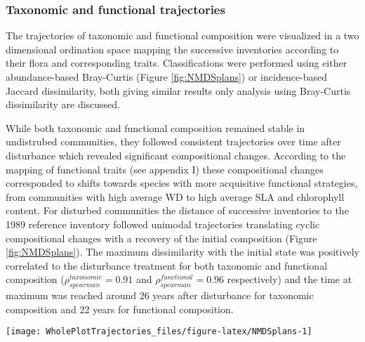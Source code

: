 \documentclass[fleqn,10pt]{ArtEcoFoG} %
\theoremstyle{definition}
\theoremstyle{definition}
\theoremstyle{definition}
\theoremstyle{remark}
\begin{document}
\subsubsection{Taxonomic and functional
trajectories}\label{taxonomic-and-functional-trajectories}

The trajectories of taxonomic and functional composition were visualized
in a two dimensional ordination space mapping the successive inventories
according to their flora and corresponding traits. Classifications were
performed using either abundance-based Bray-Curtis (Figure
\ref{fig:NMDSplans}) or incidence-based Jaccard dissimilarity, both
giving similar results only analysis using Bray-Curtis dissimilarity are
discussed.

While both taxonomic and functional composition remained stable in
undistrubed communities, they followed consistent trajectories over time
after disturbance which revealed significant compositional changes.
According to the mapping of functional traits (see appendix I) these
compositional changes corresponded to shifts towards species with more
acquisitive functional strategies, from communities with high average WD
to high average SLA and chlorophyll content. For disturbed communities
the distance of successive inventories to the 1989 reference inventory
followed unimodal trajectories translating cyclic compositional changes
with a recovery of the initial composition (Figure \ref{fig:NMDSplans}).
The maximum dissimilarity with the initial state was positively
correlated to the disturbance treatment for both taxonomic and
functional composition (\(\rho_{spearman}^{taxonomic}=0.91\) and
\(\rho_{spearman}^{functional}=0.96\) respectively) and the time at
maximum was reached around 26 years after disturbance for taxonomic
composition and 22 years for functional composition.

\begin{figure*}

{\centering \texttt{[image: WholePlotTrajectories\_files/figure-latex/NMDSplans-1]} 

}

\caption{Trajectories of the plots in terms of flora composition (left panels \textbf{(a)} and \textbf{(c)}) and functional composition (right panels \textbf{(b)} and \textbf{(d)}) regarding the 6 leaf and stem functional traits, the maximum allometric height and seed mass class. Plots trajectories are first represented in the two-dimensional space from the NMDS performed for the 30 years after disturbance based on Bray-Curtis dissimilarity measures between successive inventories (Upper panels \textbf{(a)} and \textbf{(b)}). Then the lower panels (\textbf{(c)} and \textbf{(d)}) represent the euclidean distance to initial condition along the 30 sampled years. Line colors represent the disturbance treatment (green for control, blue for T1,orange for T2 and red for T3). The 0.025 and 0.975 percentile correspond to the variance observed for 50 iteration of the taxonomic uncertainty propagation and functional trait filling processes.}\label{fig:NMDSplans}
\end{figure*}
\end{document}
